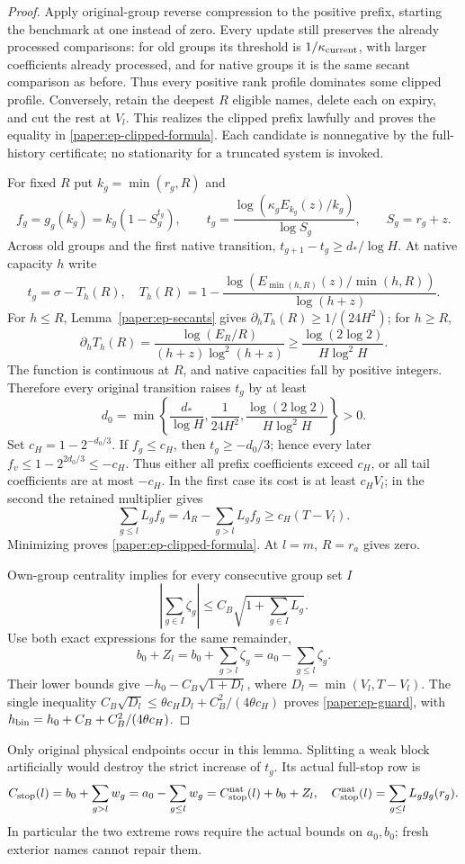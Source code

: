 \begin{proof}
Apply original-group reverse compression to the positive prefix,
starting the benchmark at one instead of zero.  Every update still
preserves the already processed comparisons: for old groups its
threshold is $1/\kappa_{\rm current}$, with larger coefficients
already processed, and for native groups it is the same secant
comparison as before.  Thus every positive rank profile dominates
some clipped profile.  Conversely, retain the deepest $R$ eligible
names, delete each on expiry, and cut the rest at $V_l$.  This realizes
the clipped prefix lawfully and proves the equality in
\eqref{paper:ep-clipped-formula}.  Each candidate is nonnegative by
the full-history certificate; no stationarity for a truncated system
is invoked.

For fixed $R$ put $k_g=\min(r_g,R)$ and
\[
 f_g=g_g(k_g)=k_g(1-S_g^{t_g}),\qquad
 t_g=\frac{\log(\kappa_gE_{k_g}(z)/k_g)}{\log S_g},
 \qquad S_g=r_g+z.
\]
Across old groups and the first native transition,
$t_{g+1}-t_g\geq d_*/\log H$.  At native capacity $h$ write
\[
 t_g=\sigma-T_h(R),\quad
 T_h(R)=1-\frac{\log(E_{\min(h,R)}(z)/\min(h,R))}{\log(h+z)}.
\]
For $h\leq R$, Lemma~\ref{paper:ep-secants} gives
$\partial_h T_h(R)\geq1/(24H^2)$; for $h\geq R$,
\[
 \partial_h T_h(R)=\frac{\log(E_R/R)}{(h+z)\log^2(h+z)}
 \geq\frac{\log(2\log2)}{H\log^2H}.
\]
The function is continuous at $R$, and native capacities fall by
positive integers.  Therefore every original transition raises $t_g$
by at least
\[
 d_0=\min\left\{\frac{d_*}{\log H},\frac1{24H^2},
                    \frac{\log(2\log2)}{H\log^2H}\right\}>0.
\]
Set $c_H=1-2^{-d_0/3}$.  If $f_g\leq c_H$, then
$t_g\geq-d_0/3$; hence every later $f_v\leq1-2^{2d_0/3}\leq-c_H$.
Thus either all prefix coefficients exceed $c_H$, or all tail
coefficients are at most $-c_H$.  In the first case its cost is at
least $c_HV_l$; in the second the retained multiplier gives
\[
 \sum_{g\leq l}L_gf_g=\Lambda_R-\sum_{g>l}L_gf_g
                 \geq c_H(T-V_l).
\]
Minimizing proves \eqref{paper:ep-clipped-formula}.  At $l=m$,
$R=r_a$ gives zero.

Own-group centrality implies for every consecutive group set $I$
\[
 \left|\sum_{g\in I}\zeta_g\right|
       \leq C_B\sqrt{1+\sum_{g\in I}L_g}.
\]
Use both exact expressions for the same remainder,
\[
 b_0+Z_l=b_0+\sum_{g>l}\zeta_g
         =a_0-\sum_{g\leq l}\zeta_g.
\]
Their lower bounds give $-h_0-C_B\sqrt{1+D_l}$, where
$D_l=\min(V_l,T-V_l)$.  The single inequality
$C_B\sqrt{D_l}\leq\theta c_HD_l+C_B^2/(4\theta c_H)$ proves
\eqref{paper:ep-guard}, with
$h_{\rm bin}=h_0+C_B+C_B^2/(4\theta c_H)$.
\end{proof}
Only original physical endpoints occur in this lemma.  Splitting a
weak block artificially would destroy the strict increase of $t_g$.
Its actual full-stop row is
\begin{equation}\label{paper:ep-full-stop}
 C_{\rm stop}(l)=b_0+\sum_{g>l}w_g
 =a_0-\sum_{g\leq l}w_g
 =C_{\rm stop}^{\rm nat}(l)+b_0+Z_l,
 \quad C_{\rm stop}^{\rm nat}(l)=\sum_{g\leq l}L_gg_g(r_g).
\end{equation}
In particular the two extreme rows require the actual bounds on
$a_0,b_0$; fresh exterior names cannot repair them.

